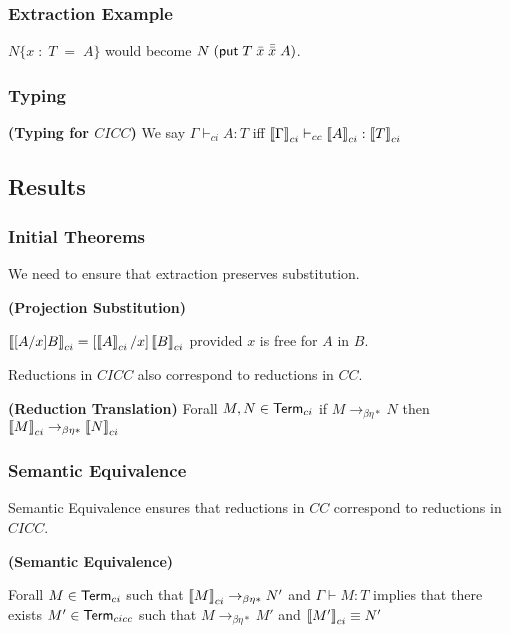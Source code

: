 \begin{frame}
\frametitle{Extraction Example}
\begin{example}
$N \{ x\; : \; T \; = \;A \} $
would become $N\;( \mathsf{put} \; T \; \bar{x} \; \bar{\bar{x}} \; A)$.
\end{example}
\end{frame}



\begin{frame}
\frametitle{Typing}


\begin{definition}
\textbf{(Typing for $CICC$)} We say $\Gamma \vdash_{ci} A : T$ iff $\left\llbracket \Gamma \right\rrbracket_{ci} \vdash_{cc} \left\llbracket A \right\rrbracket_{ci} : \left\llbracket T \right\rrbracket_{ci}$
\label{cicc:typing}
\end{definition}

\end{frame}


\subsection{Results}

\begin{frame}
\frametitle{Initial Theorems}

We need to ensure that extraction preserves substitution.

\begin{theorem}
\textbf{(Projection Substitution)}  

$\left\llbracket [A/x] B \right\rrbracket_{ci} = [ \left\llbracket A \right\rrbracket_{ci} / x ] \left\llbracket B \right\rrbracket_{ci}$ provided $x$ is free for $A$ in $B$.

\end{theorem}

Reductions in $CICC$ also correspond to reductions in $CC$.

\begin{lemma}
\textbf{(Reduction Translation)}
Forall $M, N \in \mathsf{Term}_{ci}$ if $M \rightarrow_{\beta\eta*} N$ then 
$\left\llbracket M \right\rrbracket_{ci} \rightarrow_{\beta\eta*} \left\llbracket N \right\rrbracket_{ci}$
\label{cicc:red}
\end{lemma}

\end{frame}


\begin{frame}
\frametitle{Semantic Equivalence}

Semantic Equivalence ensures that reductions in $CC$ correspond to reductions in $CICC$.

\begin{theorem}
\textbf{(Semantic Equivalence)}

Forall $M \in \mathsf{Term}_{ci}$ such that $\left\llbracket M \right\rrbracket_{ci} \rightarrow_{\beta\eta*} N'$ and 
$\Gamma \vdash M : T$ implies that there exists $M' \in \mathsf{Term}_{cicc}$ such that 
$M \rightarrow_{\beta\eta*} M'$ and $\left\llbracket M' \right\rrbracket_{ci} \equiv N'$

\end{theorem}
\end{frame}

